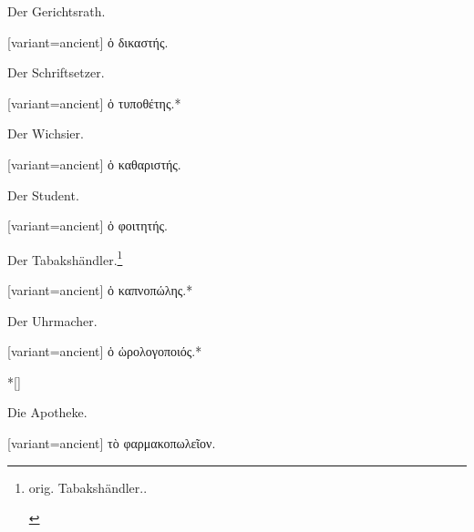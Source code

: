 Der Gerichts\textcompwordmark{}rath. 

\switchcolumn

\begin{greek}[variant=ancient]%
ὁ δικαστής.

\end{greek}%
\switchcolumn*

Der Schrift\textcompwordmark{}setzer. 

\switchcolumn

\begin{greek}[variant=ancient]%
ὁ τυποθέτης.{*}

\end{greek}%
\switchcolumn*

Der Wichsier.

\switchcolumn

\begin{greek}[variant=ancient]%
ὁ καθαριστής.

\end{greek}%
\switchcolumn*

Der Student.

\switchcolumn

\begin{greek}[variant=ancient]%
ὁ φοιτητής.

\end{greek}%
\switchcolumn*

Der Tabaks\textcompwordmark{}händler.\footnote{\begin{latin}%
orig. \textgerman[spelling=old,babelshorthands=true]{Tabaks\textcompwordmark{}händler..}\end{latin}%
}

\switchcolumn

\begin{greek}[variant=ancient]%
ὁ καπνοπώλης.{*}

\end{greek}%
\switchcolumn*

Der Uhrmacher.

\switchcolumn

\begin{greek}[variant=ancient]%
ὁ ὡρολογοποιός.{*}

\end{greek}%
\switchcolumn[0]*[\StarOrnament]

Die Apotheke.

\switchcolumn

\begin{greek}[variant=ancient]%
τὸ φαρμακοπωλεῖον.

\end{greek}%
\switchcolumn*

